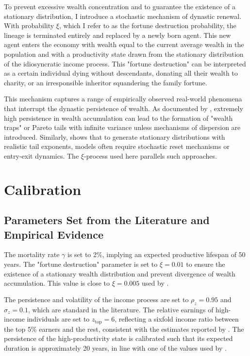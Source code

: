 \documentclass[12pt]{article}
\begin{document}
To prevent excessive wealth concentration and to guarantee the existence of a stationary distribution, I introduce a stochastic mechanism of dynastic renewal. With probability $\xi$, which I refer to as the fortune destruction probability, the lineage is terminated entirely and replaced by a newly born agent. This new agent enters the economy with wealth equal to the current average wealth in the population and with a productivity state drawn from the stationary distribution of the idiosyncratic income process. This "fortune destruction" can be interpreted as a certain individual dying without descendants, donating all their wealth to charity, or an irresponsible inheritor squandering the family fortune.

This mechanism captures a range of empirically observed real-world phenomena that interrupt the dynastic persistence of wealth. As documented by \textcite{benhabib2017}, extremely high persistence in wealth accumulation can lead to the formation of "wealth traps" or Pareto tails with infinite variance unless mechanisms of dispersion are introduced. Similarly, \textcite{gabaix2009} shows that to generate stationary distributions with realistic tail exponents, models often require stochastic reset mechanisms or entry-exit dynamics. The $\xi$-process used here parallels such approaches.

\section{Calibration}
\label{sec:calibration}

\subsection{Parameters Set from the Literature and Empirical Evidence}

The mortality rate $\gamma$ is set to 2\%, implying an expected productive lifespan of 50 years. The "fortune destruction" parameter is set to $\xi = 0.01$ to ensure the existence of a stationary wealth distribution and prevent divergence of wealth accumulation. This value is close to $\xi = 0.005$ used by \textcite{benhabib2017}.

The persistence and volatility of the income process are set to $\rho_z = 0.95$ and $\sigma_z = 0.1$, which are standard in the literature. The relative earnings of high-income individuals are set to $z_{\text{top}} = 6$, reflecting a sixfold income ratio between the top 5\% earners and the rest, consistent with the estimates reported by \textcite{piketty2018}. The persistence of the high-productivity state is calibrated such that its expected duration is approximately 20 years, in line with one of the values used by \textcite{benhabib2019}.
\end{document}
